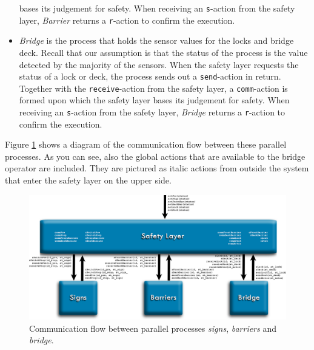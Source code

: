 \begin{itemize}
	bases its judgement for safety. When receiving an \texttt{s}-action from the safety layer, \emph{Barrier} returns a \texttt{r}-action to confirm the execution.
	\item \emph{Bridge} is the process that holds the sensor values for the locks and bridge deck. Recall that our assumption is that the status of the process is the value detected by the majority of the sensors. When the 
	safety layer requests the status of a lock or deck, the process sends out a \texttt{send}-action in return. Together with the \texttt{receive}-action from the safety layer, a \texttt{comm}-action is formed upon which the safety 
	layer 	bases its judgement for safety. When receiving an \texttt{s}-action from the safety layer, \emph{Bridge} returns a \texttt{r}-action to confirm the execution.
\end{itemize}
%
Figure \ref{fig:arch} shows a diagram of the communication flow between these parallel processes. As you can see, also the global actions that are available to the bridge operator are included. They are pictured as italic actions from outside the system that enter the safety layer on the upper side.
%
\begin{figure}[htb]%
\centering
\includegraphics[width=\columnwidth, angle=90]{Images/Architecture_2}%
\caption{Communication flow between parallel processes \emph{signs}, \emph{barriers} and \emph{bridge}.}%
\label{fig:arch}%
\end{figure}
%

\newpage

